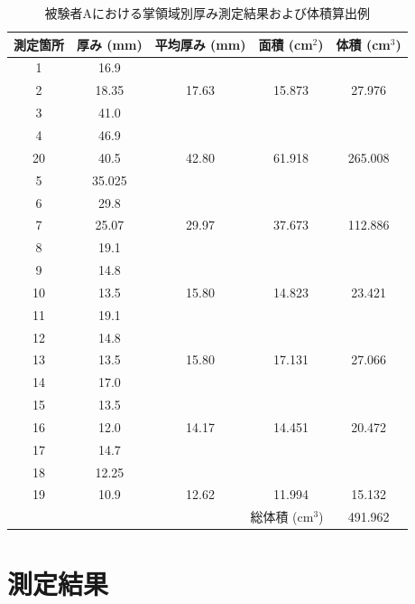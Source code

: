 \begin{table}[htbp]
  \centering
  \caption{被験者Aにおける掌領域別厚み測定結果および体積算出例}
  \label{tab:hand_region_thickness}
  \begin{tabular}{c c c c c}
    \hline
    測定箇所 & 厚み (mm) & 平均厚み (mm) & 面積 (cm$^2$) & 体積 (cm$^3$) \\
    \hline
    1  & 16.9  &        &        &        \\
    2  & 18.35 & 17.63  & 15.873 & 27.976 \\
    \hline
    3  & 41.0  &        &        &        \\
    4  & 46.9  &        &        &        \\
    20 & 40.5  & 42.80  & 61.918 & 265.008 \\
    \hline
    5  & 35.025 &        &        &        \\
    6  & 29.8   &        &        &        \\
    7  & 25.07  & 29.97  & 37.673 & 112.886 \\
    \hline
    8  & 19.1  &        &        &        \\
    9  & 14.8  &        &        &        \\
    10 & 13.5  & 15.80  & 14.823 & 23.421 \\
    \hline
    11 & 19.1  &        &        &        \\
    12 & 14.8  &        &        &        \\
    13 & 13.5  & 15.80  & 17.131 & 27.066 \\
    \hline
    14 & 17.0  &        &        &        \\
    15 & 13.5  &        &        &        \\
    16 & 12.0  & 14.17  & 14.451 & 20.472 \\
    \hline
    17 & 14.7  &        &        &        \\
    18 & 12.25 &        &        &        \\
    19 & 10.9  & 12.62  & 11.994 & 15.132 \\
    \hline
    \multicolumn{4}{r}{総体積 (cm$^3$)} & 491.962 \\
    \hline
  \end{tabular}
\end{table}


\section{測定結果}

